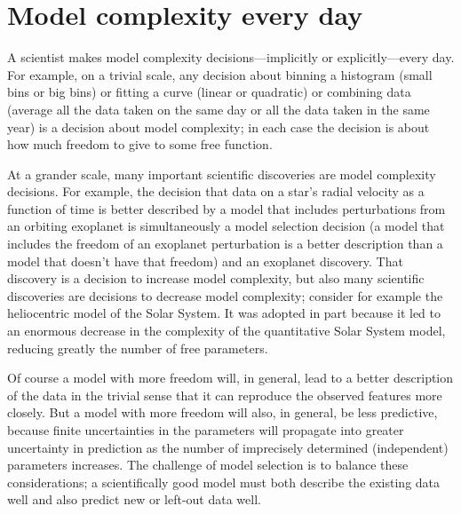 \documentclass[12pt,twoside]{article}
\begin{document}
\section{Model complexity every day}

A scientist makes model complexity decisions---implicitly or
explicitly---every day.  For example, on a trivial scale, any decision
about binning a histogram (small bins or big bins) or fitting a curve
(linear or quadratic) or combining data (average all the data taken on
the same day or all the data taken in the same year) is a decision
about model complexity; in each case the decision is about how much
freedom to give to some free function.

At a grander scale, many important scientific discoveries are model
complexity decisions.  For example, the decision that data on a star's
radial velocity as a function of time is better described by a model
that includes perturbations from an orbiting exoplanet is
simultaneously a model selection decision (a model that includes the
freedom of an exoplanet perturbation is a better description than a
model that doesn't have that freedom) and an exoplanet discovery.
That discovery is a decision to increase model complexity, but also
many scientific discoveries are decisions to decrease model
complexity; consider for example the heliocentric model of the Solar
System.  It was adopted in part because it led to an enormous decrease
in the complexity of the quantitative Solar System model, reducing
greatly the number of free parameters.

Of course a model with more freedom will, in general, lead to a better
description of the data in the trivial sense that it can reproduce the
observed features more closely.  But a model with more freedom will
also, in general, be less predictive, because finite uncertainties in
the parameters will propagate into greater uncertainty in prediction
as the number of imprecisely determined (independent) parameters
increases.  The challenge of model selection is to balance these
considerations; a scientifically good model must both describe the
existing data well and also predict new or left-out data well.
\end{document}
